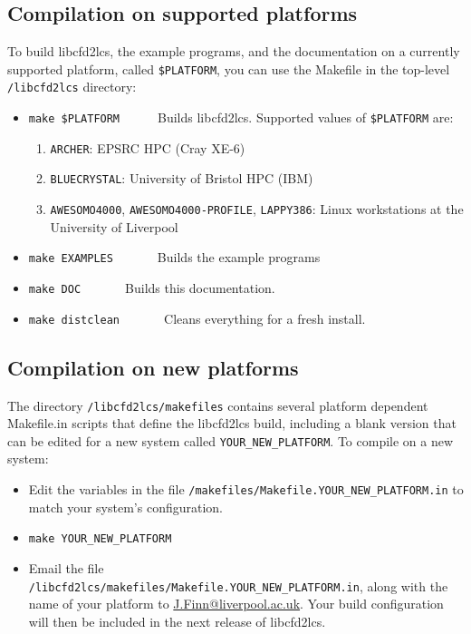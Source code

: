 \documentclass[letterpaper,11pt]{article}
\begin{document}
\subsection*{Compilation on supported platforms}
To build libcfd2lcs, the example programs, and the documentation on a currently supported platform, called \verb|$PLATFORM|, you can use the Makefile in the top-level \verb|/libcfd2lcs| directory:
\begin{itemize}
 \item \verb|make $PLATFORM|~~~~~~Builds libcfd2lcs. Supported values of \verb|$PLATFORM| are:
 \begin{enumerate}
  \item \verb|ARCHER|: EPSRC HPC (Cray XE-6)
  \item \verb|BLUECRYSTAL|:  University of Bristol HPC (IBM)
  \item \verb|AWESOMO4000|, \verb|AWESOMO4000-PROFILE|, \verb|LAPPY386|:  Linux workstations at the University of Liverpool
 \end{enumerate}
 \item \verb|make EXAMPLES|~~~~~~~Builds the example programs
 \item \verb|make DOC|~~~~~~~Builds this documentation.
 \item \verb|make distclean|~~~~~~~Cleans everything for a fresh install.
\end{itemize}

\subsection*{Compilation on new platforms}
The directory \verb|/libcfd2lcs/makefiles| contains several platform dependent Makefile.in scripts that define the libcfd2lcs build, including a blank version that can be edited for a new system called \verb|YOUR_NEW_PLATFORM|.  To compile on a new system: 
\begin{itemize}
 \item Edit the variables in the file \verb|/makefiles/Makefile.YOUR_NEW_PLATFORM.in| to match your system's configuration.
 \item \verb|make YOUR_NEW_PLATFORM|
 \item Email the file\\ \verb|/libcfd2lcs/makefiles/Makefile.YOUR_NEW_PLATFORM.in|, along with the name of your platform to \href{mailto:J.Finn@liverpool.ac.uk}{J.Finn@liverpool.ac.uk}.  Your build configuration will then be included in the next release of libcfd2lcs.
\end{itemize}
\end{document}
